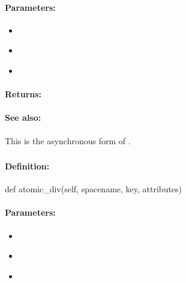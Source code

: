 \paragraph{Parameters:}
\begin{itemize}[noitemsep]
\item {}\\

\item {}\\

\item {}\\

\end{itemize}

\paragraph{Returns:}


\paragraph{See also:}  This is the asynchronous form of .

\pagebreak
\subsubsection{}
\label{api:python:atomic_div}


\paragraph{Definition:}
\begin{pythoncode}
def atomic_div(self, spacename, key, attributes)
\end{pythoncode}

\paragraph{Parameters:}
\begin{itemize}[noitemsep]
\item {}\\

\item {}\\

\item {}\\

\end{itemize}

